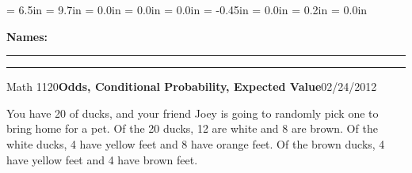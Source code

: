 \documentclass{article}
\begin{document}
\textwidth = 6.5in
\textheight = 9.7in
\oddsidemargin = 0.0in
\evensidemargin = 0.0in
\topmargin = 0.0in
\headheight = -0.45in
\headsep = 0.0in
\parskip = 0.2in
\parindent = 0.0in

\pagestyle{empty}

\textbf{Names:} \rule{6.1in}{0.01in}

\vspace{0.3in}

\noindent\rule{6.7in}{0.01in}

\centerline{Math 1120\hfill{\bf Odds, Conditional Probability, Expected Value}\hfill 02/24/2012}

\vspace{0.2in}

\noindent You have 20 of ducks, and your friend Joey is going to randomly pick one to bring home for a pet. Of the 20 ducks, 12 are white and 8 are brown. Of the white ducks, 4 have yellow feet and 8 have orange feet. Of the brown ducks, 4 have yellow feet and 4 have brown feet.
\end{document}

